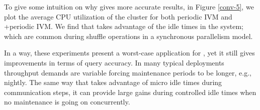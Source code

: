 To give some intuition on why \svc gives more accurate results, in Figure \ref{conv-5}, we plot the average CPU utilization of the cluster for both periodic IVM and \svcnospace+periodic IVM. 
We find that \svc takes advantage of the idle times in the system; which are common during shuffle operations in a synchronous parallelism model.

In a way, these experiments present a worst-case application for \svc, yet it still gives improvements in terms of query accuracy.
In many typical deployments throughput demands are variable forcing maintenance periods to be longer, e.g., nightly.
The same way that \svc takes advantage of micro idle times during communication steps, it can provide large gains during controlled idle times when no maintenance is going on concurrently.



